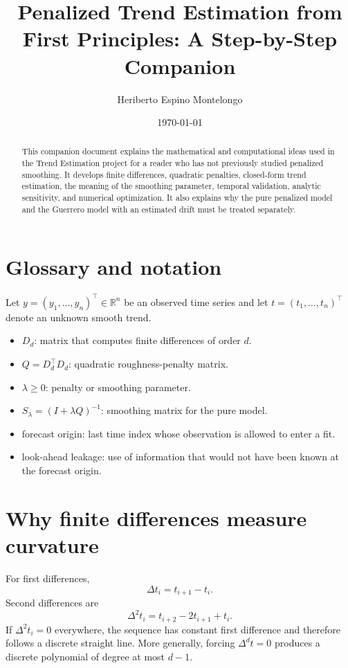 \documentclass[11pt]{article}
\title{Penalized Trend Estimation from First Principles: A Step-by-Step Companion}
\author{Heriberto Espino Montelongo}
\date{\today}
\newcommand{\R}{\mathbb{R}}
\begin{document}
\maketitle

\begin{abstract}
This companion document explains the mathematical and computational ideas used
in the Trend Estimation project for a reader who has not previously studied
penalized smoothing. It develops finite differences, quadratic penalties,
closed-form trend estimation, the meaning of the smoothing parameter, temporal
validation, analytic sensitivity, and numerical optimization. It also explains
why the pure penalized model and the Guerrero model with an estimated drift
must be treated separately.
\end{abstract}

\section{Glossary and notation}
Let $y=(y_1,\ldots,y_n)^\top\in\R^n$ be an observed time series and let
$t=(t_1,\ldots,t_n)^\top$ denote an unknown smooth trend.

\begin{itemize}
\item $D_d$: matrix that computes finite differences of order $d$.
\item $Q=D_d^\top D_d$: quadratic roughness-penalty matrix.
\item $\lambda\ge 0$: penalty or smoothing parameter.
\item $S_\lambda=(I+\lambda Q)^{-1}$: smoothing matrix for the pure model.
\item forecast origin: last time index whose observation is allowed to enter a fit.
\item look-ahead leakage: use of information that would not have been known at the forecast origin.
\end{itemize}

\section{Why finite differences measure curvature}
For first differences,
\[
\Delta t_i=t_{i+1}-t_i.
\]
Second differences are
\[
\Delta^2t_i=t_{i+2}-2t_{i+1}+t_i.
\]
If $\Delta^2t_i=0$ everywhere, the sequence has constant first difference and
therefore follows a discrete straight line. More generally, forcing
$\Delta^dt=0$ produces a discrete polynomial of degree at most $d-1$.
\end{document}
